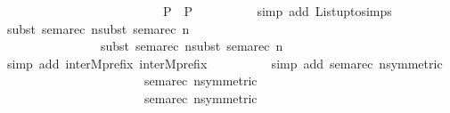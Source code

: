 \begin{isabellebody}
\ \ \ \ \ \ \ \ \ \ \ \ \ \ \ \ \ \ \ \ \ \ \ \ {\isacharbar}{\kern0pt}{\isacharbar}{\kern0pt}\ {\isacharparenleft}{\kern0pt}P{}\ {\isacharbar}{\kern0pt}{\isacharbar}{\kern0pt}{\isacharbar}{\kern0pt}\ P{}{\isacharparenright}{\kern0pt}{\isachardoublequoteclose}\isanewline
\ \ \ \ \ \ \ \ \ \isamarkupfalse%
{\isacharparenleft}{\kern0pt}simp\ add{\isacharcolon}{\kern0pt}\ List{\isachardot}{\kern0pt}upto{\isachardot}{\kern0pt}simps{\isacharparenright}{\kern0pt}\isanewline
\ \ \ \ \ \ \ \ \ \isamarkupfalse%
{\isacharparenleft}{\kern0pt}subst\ sema{\isacharunderscore}{\kern0pt}rec{\isacharbrackleft}{\kern0pt}\ n{\isacharequal}{\kern0pt}{\isacartoucheopen}{}{\isacartoucheclose}{\isacharbrackright}{\kern0pt}{\isacharcomma}{\kern0pt}subst\ sema{\isacharunderscore}{\kern0pt}rec{\isacharbrackleft}{\kern0pt}\ n{\isacharequal}{\kern0pt}{\isacartoucheopen}{}{\isacartoucheclose}{\isacharbrackright}{\kern0pt}{\isacharcomma}{\kern0pt}\isanewline
\ \ \ \ \ \ \ \ \ \ \ \ \ \ \ subst\ sema{\isacharunderscore}{\kern0pt}rec{\isacharbrackleft}{\kern0pt}\ n{\isacharequal}{\kern0pt}{\isacartoucheopen}{}{\isacartoucheclose}{\isacharbrackright}{\kern0pt}{\isacharcomma}{\kern0pt}subst\ sema{\isacharunderscore}{\kern0pt}rec{\isacharbrackleft}{\kern0pt}\ n{\isacharequal}{\kern0pt}{\isacartoucheopen}{}{\isacartoucheclose}{\isacharbrackright}{\kern0pt}{\isacharparenright}{\kern0pt}\ \isanewline
\ \ \ \ \ \ \ \ \ \isamarkupfalse%
{\isacharparenleft}{\kern0pt}simp\ add{\isacharcolon}{\kern0pt}\ inter{}Mprefix{}\ inter{}Mprefix{}{\isacharparenright}{\kern0pt}\isanewline
\ \ \ \ \ \ \ \ \ \isamarkupfalse%
{\isacharparenleft}{\kern0pt}simp\ add{\isacharcolon}{\kern0pt}\ sema{\isacharunderscore}{\kern0pt}rec{\isacharbrackleft}{\kern0pt}\ n{\isacharequal}{\kern0pt}{\isacartoucheopen}{}{\isacartoucheclose}{\isacharcomma}{\kern0pt}symmetric{\isacharbrackright}{\kern0pt}\ \isanewline
\ \ \ \ \ \ \ \ \ \ \ \ \ \ \ \ \ \ \ \ \ \ sema{\isacharunderscore}{\kern0pt}rec{\isacharbrackleft}{\kern0pt}\ n{\isacharequal}{\kern0pt}{\isacartoucheopen}{}{\isacartoucheclose}{\isacharcomma}{\kern0pt}symmetric{\isacharbrackright}{\kern0pt}\ \isanewline
\ \ \ \ \ \ \ \ \ \ \ \ \ \ \ \ \ \ \ \ \ \ sema{\isacharunderscore}{\kern0pt}rec{\isacharbrackleft}{\kern0pt}\ n{\isacharequal}{\kern0pt}{\isacartoucheopen}{}{\isacartoucheclose}{\isacharcomma}{\kern0pt}symmetric{\isacharbrackright}{\kern0pt}\ \isanewline

\end{isabellebody}
